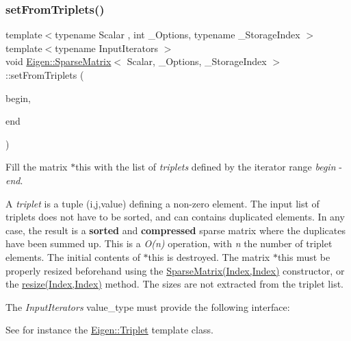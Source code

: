\subsubsection{\texorpdfstring{setFromTriplets()}{setFromTriplets()}\hspace{0.1cm}{\footnotesize\ttfamily [1/2]}}
{\footnotesize\ttfamily template$<$typename Scalar , int \+\_\+\+Options, typename \+\_\+\+Storage\+Index $>$ \\
template$<$typename Input\+Iterators $>$ \\
void \mbox{\hyperlink{class_eigen_1_1_sparse_matrix}{Eigen\+::\+Sparse\+Matrix}}$<$ Scalar, \+\_\+\+Options, \+\_\+\+Storage\+Index $>$\+::set\+From\+Triplets (\begin{DoxyParamCaption}\item[{const Input\+Iterators \&}]{begin,  }\item[{const Input\+Iterators \&}]{end }\end{DoxyParamCaption})}

Fill the matrix {\ttfamily $\ast$this} with the list of {\itshape triplets} defined by the iterator range {\itshape begin} -\/ {\itshape end}.

A {\itshape triplet} is a tuple (i,j,value) defining a non-\/zero element. The input list of triplets does not have to be sorted, and can contains duplicated elements. In any case, the result is a {\bfseries{sorted}} and {\bfseries{compressed}} sparse matrix where the duplicates have been summed up. This is a {\itshape O(n)} operation, with {\itshape n} the number of triplet elements. The initial contents of {\ttfamily $\ast$this} is destroyed. The matrix {\ttfamily $\ast$this} must be properly resized beforehand using the \mbox{\hyperlink{class_eigen_1_1_sparse_matrix_a6abf1015a0243be97648e106a17b01ea}{Sparse\+Matrix(\+Index,\+Index)}} constructor, or the \mbox{\hyperlink{class_eigen_1_1_sparse_matrix_af88551f30202341b7cc24cfadabdec5c}{resize(\+Index,\+Index)}} method. The sizes are not extracted from the triplet list.

The {\itshape Input\+Iterators} value\+\_\+type must provide the following interface\+: 
\begin{DoxyCode}{0}
\end{DoxyCode}
 See for instance the \mbox{\hyperlink{class_eigen_1_1_triplet}{Eigen\+::\+Triplet}} template class.

